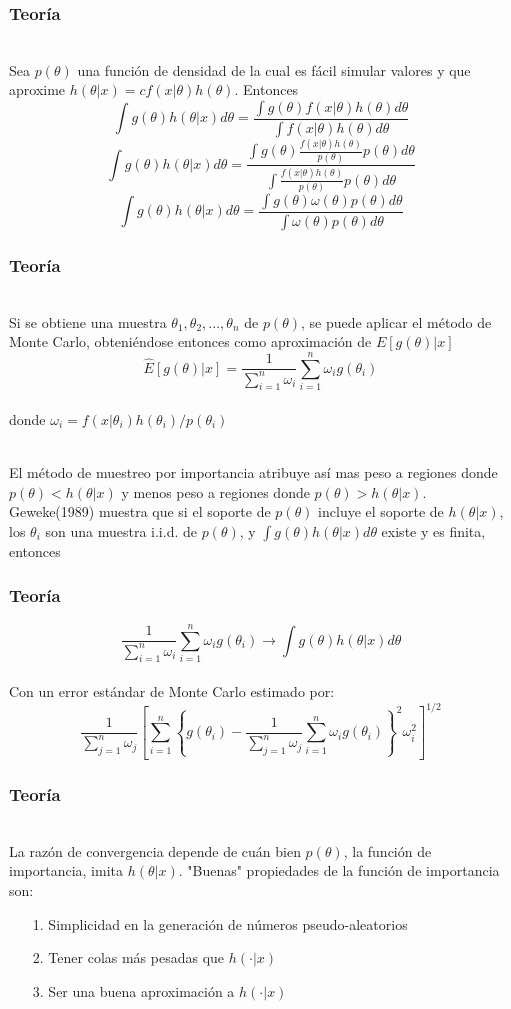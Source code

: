 \documentclass[12pt]{beamer}
\begin{document}
\begin{frame}
\frametitle{Teoría}
~\\Sea $p(\theta)$ una función de densidad de la cual es fácil simular valores y que aproxime $h(\theta|x)=cf(x|\theta)h(\theta)$. Entonces
$$\int g(\theta)h(\theta|x)d\theta=\frac{\int g(\theta)f(x|\theta)h(\theta)d\theta}{\int f(x|\theta)h(\theta)d\theta}$$
$$\int g(\theta)h(\theta|x)d\theta=\frac{\int g(\theta)\frac{f(x|\theta)h(\theta)}{p(\theta)}p(\theta)d\theta}{\int\frac{f(x|\theta)h(\theta)}{p(\theta)}p(\theta)d\theta}$$
$$\int g(\theta)h(\theta|x)d\theta=\frac{\int g(\theta)\omega(\theta)p(\theta)d\theta}{\int \omega(\theta)p(\theta)d\theta}$$
\end{frame}

\begin{frame}
\frametitle{Teoría}
~\\ Si se obtiene una muestra $\theta_{1},\theta_{2},...,\theta_{n}$ de $p(\theta)$, se puede aplicar el método de Monte Carlo, obteniéndose entonces como aproximación de $E[g(\theta)|x]$
$$\hat{E}[g(\theta)|x]=\frac{1}{\sum\limits_{i=1}^{n}\omega_{i}}\sum\limits_{i=1}^{n}\omega_{i}g(\theta_{i})$$
~\\donde $\omega_{i}=f(x|\theta_{i})h(\theta_{i})/p(\theta_{i})$

~\\El método de muestreo por importancia atribuye así mas peso a regiones donde $p(\theta)<h(\theta|x)$ y menos peso a regiones donde $p(\theta)>h(\theta|x)$. Geweke(1989) muestra que si el soporte de $p(\theta)$ incluye el soporte de $h(\theta|x)$, los $\theta_{i}$ son una muestra i.i.d. de $p(\theta)$, y $\int g(\theta)h(\theta|x)d\theta$ existe y es finita, entonces
\end{frame}

\begin{frame}
\frametitle{Teoría}
$$\frac{1}{\sum\limits_{i=1}^{n}\omega_{i}}\sum\limits_{i=1}^{n}\omega_{i}g(\theta_{i}) \rightarrow \int g(\theta)h(\theta|x)d\theta$$
~\\Con un error estándar de Monte Carlo estimado por:
$$\frac{1}{\sum\limits_{j=1}^{n}\omega_{j}}\left[\sum\limits_{i=1}^{n}\left\lbrace g(\theta_{i})-\frac{1}{\sum\limits_{j=1}^{n}\omega_{j}}\sum\limits_{i=1}^{n}\omega_{i}g(\theta_{i})\right\rbrace^{2}\omega_{i}^2\right]^{1/2} $$
\end{frame}

\begin{frame}
\frametitle{Teoría}
~\\La razón de convergencia depende de cuán bien $p(\theta)$, la función de importancia, imita $h(\theta|x)$. "Buenas" propiedades de la función de importancia son: 
\begin{itemize}
\item[1.]Simplicidad en la generación de números pseudo-aleatorios
\item[2.]Tener colas más pesadas que $h(\cdot|x)$
\item[3.]Ser una buena aproximación a $h(\cdot|x)$
\end{itemize}
\end{frame}
\end{document}
